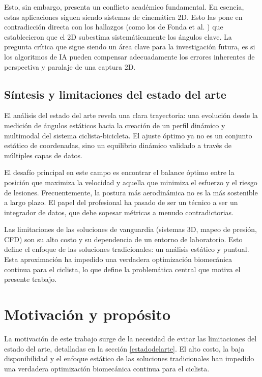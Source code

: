 Esto, sin embargo, presenta un conflicto académico fundamental. En esencia,
estas aplicaciones siguen siendo sistemas de cinemática 2D. Esto las pone en
contradicción directa con los hallazgos (como los de Fonda et al.
\citep{fonda2013validity}) que establecieron que el 2D subestima
sistemáticamente los ángulos clave. La pregunta crítica que sigue siendo un
área clave para la investigación futura, es si los algoritmos de IA pueden
compensar adecuadamente los errores inherentes de perspectiva y paralaje de una
captura 2D.

\subsection{Síntesis y limitaciones del estado del arte}

El análisis del estado del arte revela una clara trayectoria: una evolución
desde la medición de ángulos estáticos hacia la creación de un perfil dinámico
y multimodal del sistema ciclista-bicicleta. El ajuste óptimo ya no es un
conjunto estático de coordenadas, sino un equilibrio dinámico validado a través
de múltiples capas de datos.

El desafío principal en este campo es encontrar el balance óptimo entre la
posición que maximiza la velocidad y aquella que minimiza el esfuerzo y el
riesgo de lesiones. Frecuentemente, la postura más aerodinámica no es la más
sostenible a largo plazo. El papel del profesional ha pasado de ser un técnico
a ser un integrador de datos, que debe sopesar métricas a menudo
contradictorias.

Las limitaciones de las soluciones de vanguardia (sistemas 3D, mapeo de
presión, CFD) son su alto costo y su dependencia de un entorno de laboratorio.
Esto define el enfoque de las soluciones tradicionales: un análisis estático y
puntual. Esta aproximación ha impedido una verdadera optimización biomecánica
continua para el ciclista, lo que define la problemática central que motiva el
presente trabajo.


\section{Motivación y propósito}
\label{mot}

La motivación de este trabajo surge de la necesidad de evitar las limitaciones
del estado del arte, detalladas en la sección \ref{estadodelarte}. El alto
costo, la baja disponibilidad y el enfoque estático de las soluciones
tradicionales han impedido una verdadera optimización biomecánica continua para
el ciclista.

